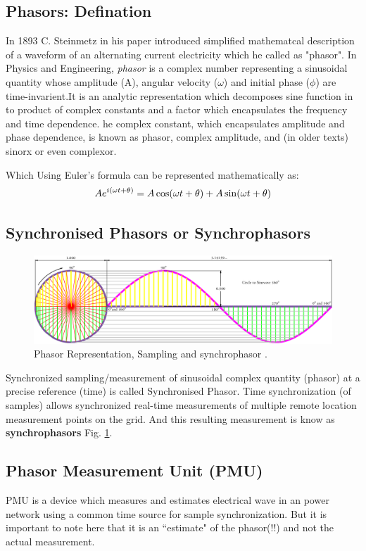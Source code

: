 \subsection{Phasors: Defination}

In 1893 C. Steinmetz in his paper introduced simplified mathematcal description of a waveform of an alternating current electricity which he called as "phasor". In Physics and Engineering, \textit{phasor} is a complex number representing a sinusoidal quantity whose amplitude (A), angular velocity ($\omega$) and initial phase ($\phi$) are time-invarient.It is an analytic representation which decomposes sine function in to product of complex constants and a factor which encapsulates the frequency and time dependence. he complex constant, which encapsulates amplitude and phase dependence, is known as phasor, complex amplitude, and (in older texts) sinorx or even complexor.

Which Using Euler's formula can be represented mathematically as:
\begin{equation}\boldmath
Ae^{i(\omega t + \theta)} = A\cos(\omega t + \theta) + A\sin(\omega t + \theta)
\end{equation}

\subsection{Synchronised Phasors or Synchrophasors}
\begin{figure}
	\includegraphics[width=\textwidth]{fig/Circle-To-Sine-Wave.png}
	\caption{Phasor Representation, Sampling and synchrophasor \cite{CirSinWave} .} 
	\label{fig:CirSin}
\end{figure}
 Synchronized sampling/measurement of sinusoidal complex quantity (phasor) at a precise reference (time) is called Synchronised Phasor. Time synchronization (of samples) allows synchronized real-time measurements of multiple remote location measurement points on the grid. And this resulting measurement is know as \textbf{synchrophasors} Fig. \ref{fig:CirSin}.
\subsection{Phasor Measurement Unit (PMU)}
PMU is a device which measures and estimates electrical wave in an power network using a common time source for sample synchronization. But it is important to note here that it is an ``estimate" of the phasor(!!) and not the actual measurement. 

